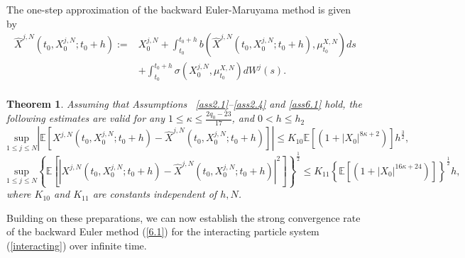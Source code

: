 \documentclass[12pt]{article}
\numberwithin{equation}{section}
\newtheorem{theorem}[assumption]{Theorem}   %
\begin{document}

The one-step approximation of the backward Euler-Maruyama method is given by
\begin{equation}\tag{3.28}\label{6.22}
\begin{aligned}
\hat{X}^{j,N}\left( t_0,X^{j,N}_0;t_0+h \right) :=&X^{j,N}_0+\int_{t_0}^{t_0+h}{b\left( \hat{X}^{j,N}\left( t_0,X^{j,N}_0;t_0+h \right) ,\mu _{t_0}^{X,N} \right)}ds\\
&+\int_{t_0}^{t_0+h}{\sigma \left( X^{j,N}_0,\mu _{t_0}^{X,N} \right)}dW^j\left( s \right).\\
\end{aligned}
\end{equation} 

\begin{theorem}\label{theorem6.7}
   Assuming that Assumptions~ \ref{ass2.1}--\ref{ass2.4} and \ref{ass6.1} hold, the following estimates are valid for any $1 \leq\kappa\leq \tfrac{2q_0-23}{17}$, and $0<h \leq h_2$   
\begin{equation}\tag{3.29}\label{6.44}
\underset{1\leqslant j\leqslant N}{\mathrm{sup}}\left|\mathbb{E}\left [X^{j,N}\left( t_0,X^{j,N}_0;t_0+h \right) -\hat{X}^{j,N}\left( t_0,X^{j,N}_0;t_0+h \right) \right]\right|\le K_{10}\mathbb{E} \left[\left( 1+\left|X_0\right|^{8\kappa+2}\right) \right] h^{\frac{3}{2}},
\end{equation}
\begin{equation}\tag{3.30}\label{6.45}
\underset{1\leqslant j\leqslant N}{\mathrm{sup}}\left\{ \mathbb{E} \left[ \left|X^{j,N}\left( t_0,X^{j,N}_0;t_0+h \right) -\hat{X}^{j,N}\left( t_0,X^{j,N}_0;t_0+h \right)\right |^2 \right] \right\} ^{\frac{1}{2}}\le K_{11}\left\{ \mathbb{E} \left[ \left(1+\left|X_0\right|^{16\kappa +24}\right) \right] \right\} ^{\frac{1}{2}}h,
\end{equation}
where $K_{10}$ and $K_{11}$ are constants independent of $h, N$.
\end{theorem}

Building on these preparations, we can now establish the strong convergence rate of the backward Euler method (\ref{6.1}) for the interacting particle system (\ref{interacting}) over infinite time.  
\end{document}

